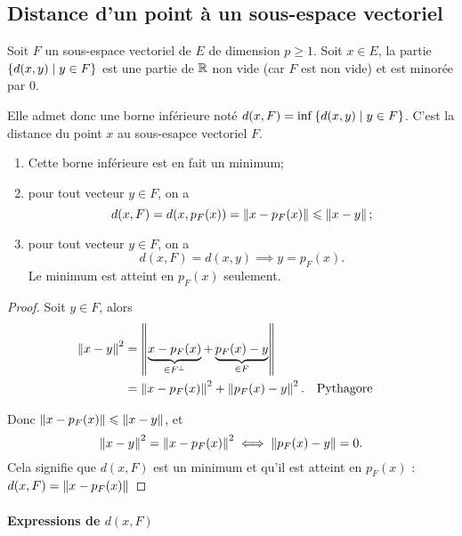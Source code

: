 \subsection{Distance d'un point à un sous-espace vectoriel}

Soit \(F\) un sous-espace vectoriel de \(E\) de dimension \(p \geqslant 1\). Soit \(x \in E\), la partie \(\left\{d(x,y)\mathrel{}\middle|\mathrel{}y \in F\right\}\) est une partie de \(\mathbb{R}\) non vide (car \(F\) est non vide) et est minorée par \(0\).

Elle admet donc une borne inférieure noté \(d(x,F)=\inf\left\{d(x,y)\mathrel{}\middle|\mathrel{}y \in F\right\}\). C'est la distance du point \(x\) au sous-esapce vectoriel \(F\).

\begin{theo}
  \begin{enumerate}
  \item Cette borne inférieure est en fait un minimum;
  \item pour tout vecteur \(y \in F\), on a
    \begin{equation}
      d(x,F) = d(x,p_F(x)) = \left\lVert x-p_F(x)\right\rVert \leqslant \left\lVert x-y\right\rVert;    
    \end{equation}
  \item pour tout vecteur \(y \in F\), on a
    \begin{equation}
      d(x,F) = d(x,y) \implies y=p_F(x).
    \end{equation}
    Le minimum est atteint en \(p_F(x)\) seulement.
  \end{enumerate}
\end{theo}
\begin{proof}
  Soit \(y \in F\), alors
  \begin{align}
    \left\lVert x-y\right\rVert^2 &=\left\lVert\underbrace{x-p_F(x)}_{\in F^\perp} + \underbrace{p_F(x)-y}_{\in F}\right\rVert\\
    &=\left\lVert x-p_F(x)\right\rVert^2 + \left\lVert p_F(x)-y\right\rVert^2. && \text{Pythagore}
  \end{align}
  
  Donc \(\left\lVert x-p_F(x)\right\rVert \leqslant \left\lVert x-y\right\rVert\), et
  \begin{equation}
    \left\lVert x-y\right\rVert^2 = \left\lVert x-p_F(x)\right\rVert^2 \iff  \left\lVert p_F(x)-y\right\rVert=0.
  \end{equation}
  Cela signifie que \(d(x,F)\) est un minimum et qu'il est atteint en \(p_F(x)\) : \(d(x,F)=\left\lVert x-p_F(x)\right\rVert\)
\end{proof}

\paragraph{Expressions de \(d(x,F)\)}

